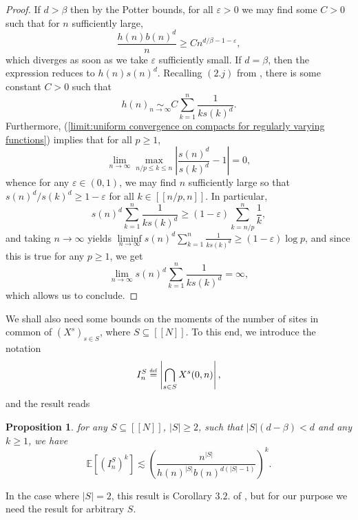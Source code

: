 \documentclass[10pt,a4paper]{amsart}
\newcommand{\EE}{\mathbb E}
\newcommand{\1}{\mathds{1}}
\newcommand{\eqdef}{\stackrel{\scaleto{\mathrm{def}}{3.5pt}}{=}}
\newtheorem{proposition}{Proposition}
\numberwithin{equation}{section}
\begin{document}
\begin{proof}
    If $d>\beta$ then by the Potter bounds, for all $\varepsilon>0$ we may find some $C>0$ such that for $n$ sufficiently large, 
    \begin{equation*}
        \frac{h(n)b(n)^d}{n}\ge Cn^{d/\beta-1-\varepsilon},
    \end{equation*}
    which diverges as soon as we take $\varepsilon$ sufficiently small. If $d=\beta$, then the expression reduces to $h(n)s(n)^d$. Recalling $(2.j)$ from \cite{LeGallRosenRangeOfStableRandomWalks1991}, there is some constant $C>0$ such that 
    \begin{equation*}
        h(n)\underset{n\rightarrow\infty}\sim C\sum_{k=1}^n\frac{1}{ks(k)^d}.
    \end{equation*}
    Furthermore, (\ref{limit:uniform convergence on compacts for regularly varying functions}) implies that for all $p\ge1$, 
    \begin{equation*}
        \underset{n\rightarrow\infty}\lim\max_{n/p\le k\le n}\left|\frac{s(n)^d}{s(k)^d}-1\right|=0,
    \end{equation*}
    whence for any $\varepsilon\in(0,1)$, we may find $n$ sufficiently large so that $s(n)^d/s(k)^d\ge1-\varepsilon$ for all $k\in[\![n/p,n]\!]$. In particular,
    \begin{equation*}
        s(n)^d\sum_{k=1}^n\frac{1}{ks(k)^d}\ge(1-\varepsilon)\sum_{k=n/p}^n\frac1k,
    \end{equation*}
    and taking $n\rightarrow\infty$ yields $\underset{n\rightarrow\infty}\liminf s(n)^d\sum_{k=1}^n\frac{1}{ks(k)^d}\ge (1-\varepsilon)\log p$, and since this is true for any $p\ge1$, we get 
    \begin{equation*}
        \underset{n\rightarrow\infty}\lim s(n)^d\sum_{k=1}^n\frac{1}{ks(k)^d}=\infty,
    \end{equation*}
    which allows us to conclude.
\end{proof}

We shall also need some bounds on the moments of the number of sites in common of $(X^s)_{s\in S}$, where $S\subseteq[\![N]\!]$. To this end, we introduce the notation
    \begin{equation*}
        I_n^S\eqdef\left|\bigcap_{s\in S} X^s(0,n)\right|,
    \end{equation*}
    and the result reads
    \begin{proposition}
        \label{proposition:bounds on moments of intersections}
        for any $S\subseteq[\![N]\!]$, $|S|\ge2$, such that $|S|(d-\beta)<d$ and any $k\ge1$, we have 
        \begin{equation*}
        \EE\left[\left(I_n^S\right)^k\right]\lesssim\left(\frac{n^{|S|}}{h(n)^{|S|}b(n)^{d(|S|-1)}}\right)^k.
        \end{equation*}
    \end{proposition}
    In the case where $|S|=2$, this result is Corollary $3.2.$ of \cite{LeGallRosenRangeOfStableRandomWalks1991}, but for our purpose we need the result for arbitrary $S$.
\end{document}
